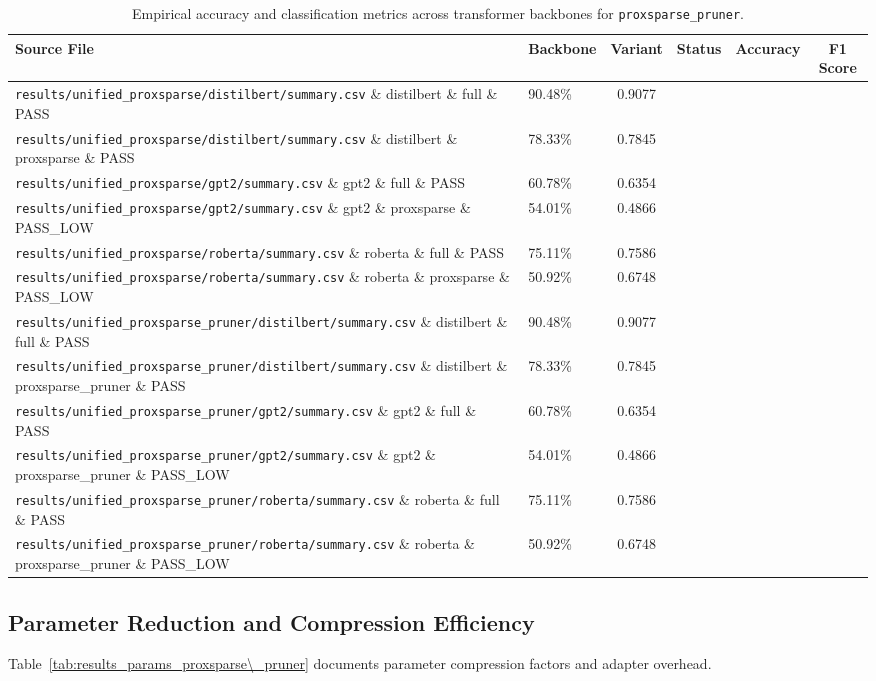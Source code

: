 \begin{table}[t]
\centering
\small
\begin{tabularx}{\linewidth}{llcccc}
\toprule
\textbf{Source File} & \textbf{Backbone} & \textbf{Variant} & \textbf{Status} & \textbf{Accuracy} & \textbf{F1 Score} \\
\midrule
\texttt{results/unified\_proxsparse/distilbert/summary.csv} \& distilbert \& full \& PASS & 90.48\% & 0.9077 \\
\texttt{results/unified\_proxsparse/distilbert/summary.csv} \& distilbert \& proxsparse \& PASS & 78.33\% & 0.7845 \\
\texttt{results/unified\_proxsparse/gpt2/summary.csv} \& gpt2 \& full \& PASS & 60.78\% & 0.6354 \\
\texttt{results/unified\_proxsparse/gpt2/summary.csv} \& gpt2 \& proxsparse \& PASS\_LOW & 54.01\% & 0.4866 \\
\texttt{results/unified\_proxsparse/roberta/summary.csv} \& roberta \& full \& PASS & 75.11\% & 0.7586 \\
\texttt{results/unified\_proxsparse/roberta/summary.csv} \& roberta \& proxsparse \& PASS\_LOW & 50.92\% & 0.6748 \\
\texttt{results/unified\_proxsparse\_pruner/distilbert/summary.csv} \& distilbert \& full \& PASS & 90.48\% & 0.9077 \\
\texttt{results/unified\_proxsparse\_pruner/distilbert/summary.csv} \& distilbert \& proxsparse\_pruner \& PASS & 78.33\% & 0.7845 \\
\texttt{results/unified\_proxsparse\_pruner/gpt2/summary.csv} \& gpt2 \& full \& PASS & 60.78\% & 0.6354 \\
\texttt{results/unified\_proxsparse\_pruner/gpt2/summary.csv} \& gpt2 \& proxsparse\_pruner \& PASS\_LOW & 54.01\% & 0.4866 \\
\texttt{results/unified\_proxsparse\_pruner/roberta/summary.csv} \& roberta \& full \& PASS & 75.11\% & 0.7586 \\
\texttt{results/unified\_proxsparse\_pruner/roberta/summary.csv} \& roberta \& proxsparse\_pruner \& PASS\_LOW & 50.92\% & 0.6748 \\
\bottomrule
\end{tabularx}
\caption{Empirical accuracy and classification metrics across transformer backbones for \texttt{proxsparse\_pruner}.}
\label{tab:results_acc_proxsparse\_pruner}
\end{table}

\subsection{Parameter Reduction and Compression Efficiency}
Table~\ref{tab:results_params_proxsparse\_pruner} documents parameter compression factors and adapter overhead.

